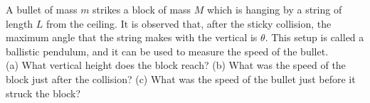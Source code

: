 A bullet of mass $m$ strikes a block of mass $M$ which is hanging by
a string of length $L$ from the ceiling. It is observed that, after the sticky collision,
the maximum angle that the string makes with the vertical is $\theta$.
This setup is called a ballistic pendulum, and it can be used to measure
the speed of the bullet.\\
%
(a) What vertical height does the block reach?\answercheck\hwendpart
%
(b) What was the speed of the block just after the
collision?\answercheck\hwendpart
%
(c) What was the speed of the bullet just before it struck the
block?\answercheck
